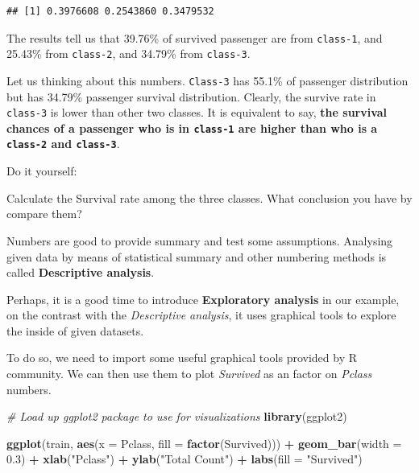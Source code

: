 \documentclass[
]{book}
\makeatletter
\newenvironment{Shaded}{\begin{snugshade}}{\end{snugshade}}
\newcommand{\CommentTok}[1]{\textcolor[rgb]{0.56,0.35,0.01}{\textit{#1}}}
\newcommand{\DataTypeTok}[1]{\textcolor[rgb]{0.13,0.29,0.53}{#1}}
\newcommand{\FloatTok}[1]{\textcolor[rgb]{0.00,0.00,0.81}{#1}}
\newcommand{\KeywordTok}[1]{\textcolor[rgb]{0.13,0.29,0.53}{\textbf{#1}}}
\newcommand{\NormalTok}[1]{#1}
\newcommand{\OperatorTok}[1]{\textcolor[rgb]{0.81,0.36,0.00}{\textbf{#1}}}
\newcommand{\StringTok}[1]{\textcolor[rgb]{0.31,0.60,0.02}{#1}}
\newenvironment{kframe}{%
\medskip{}
\setlength{\fboxsep}{.8em}
 \def\at@end@of@kframe{}%
 \ifinner\ifhmode%
  \def\at@end@of@kframe{\end{minipage}}%
  \begin{minipage}{\columnwidth}%
 \fi\fi%
 \def\FrameCommand##1{\hskip\@totalleftmargin \hskip-\fboxsep
 \colorbox{shadecolor}{##1}\hskip-\fboxsep
     \hskip-\linewidth \hskip-\@totalleftmargin \hskip\columnwidth}%
 \MakeFramed {\advance\hsize-\width
   \@totalleftmargin\z@ \linewidth\hsize
   \@setminipage}}%
 {\par\unskip\endMakeFramed%
 \at@end@of@kframe}
\newenvironment{rmdblock}[1]
  {
  \begin{itemize}
  \renewcommand{\labelitemi}{
    \raisebox{-.7\height}[0pt][0pt]{
      {\setkeys{Gin}{width=3em,keepaspectratio}\texttt{[image: images/\#1]}}
    }
  }
  \setlength{\fboxsep}{1em}
  \begin{kframe}
  \item
  }
  {
  \end{kframe}
  \end{itemize}
  }
\newenvironment{rmdaction}
  {\begin{rmdblock}{action}}
  {\end{rmdblock}}
\makeatother
\begin{document}
\begin{verbatim}
## [1] 0.3976608 0.2543860 0.3479532
\end{verbatim}

The results tell us that 39.76\% of survived passenger are from \texttt{class-1}, and 25.43\% from \texttt{class-2}, and 34.79\% from \texttt{class-3}.

Let us thinking about this numbers. \texttt{Class-3} has 55.1\% of passenger distribution but has 34.79\% passenger survival distribution. Clearly, the survive rate in \texttt{class-3} is lower than other two classes. It is equivalent to say, \textbf{the survival chances of a passenger who is in \texttt{class-1} are higher than who is a \texttt{class-2} and \texttt{class-3}}.

\begin{rmdaction}
Do it yourself:

Calculate the Survival rate among the three classes. What conclusion you have by compare them?
\end{rmdaction}

Numbers are good to provide summary and test some assumptions. Analysing given data by means of statistical summary and other numbering methods is called \textbf{Descriptive analysis}.

Perhaps, it is a good time to introduce \textbf{Exploratory analysis} in our example, on the contrast with the \emph{Descriptive analysis}, it uses graphical tools to explore the inside of given datasets.

To do so, we need to import some useful graphical tools provided by R community. We can then use them to plot \emph{Survived} as an factor on \emph{Pclass} numbers.

\begin{Shaded}
\begin{Highlighting}[]
\CommentTok{# Load up ggplot2 package to use for visualizations}
\KeywordTok{library}\NormalTok{(ggplot2)}

\KeywordTok{ggplot}\NormalTok{(train, }\KeywordTok{aes}\NormalTok{(}\DataTypeTok{x =}\NormalTok{ Pclass, }\DataTypeTok{fill =} \KeywordTok{factor}\NormalTok{(Survived))) }\OperatorTok{+}
\StringTok{  }\KeywordTok{geom_bar}\NormalTok{(}\DataTypeTok{width =} \FloatTok{0.3}\NormalTok{) }\OperatorTok{+}
\StringTok{  }\KeywordTok{xlab}\NormalTok{(}\StringTok{"Pclass"}\NormalTok{) }\OperatorTok{+}
\StringTok{  }\KeywordTok{ylab}\NormalTok{(}\StringTok{"Total Count"}\NormalTok{) }\OperatorTok{+}
\StringTok{  }\KeywordTok{labs}\NormalTok{(}\DataTypeTok{fill =} \StringTok{"Survived"}\NormalTok{)}
\end{Highlighting}
\end{Shaded}
\end{document}
